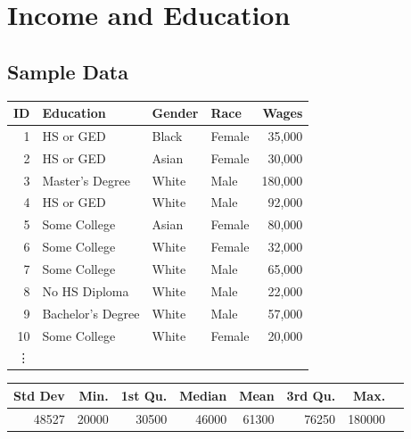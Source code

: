 \documentclass{exam}
\begin{document}

  \section{Income and Education}

  \subsection{Sample Data}

  \begin{table}[H]
    \centering
    \begin{tabular}{rlllr}
      \toprule
        ID & Education         & Gender   & Race   & Wages \\
      \midrule
         1 & HS or GED         & Black & Female & 35,000 \\
         2 & HS or GED         & Asian & Female & 30,000 \\
         3 & Master's Degree   & White & Male   & 180,000 \\
         4 & HS or GED         & White & Male   & 92,000 \\
         5 & Some College      & Asian & Female & 80,000 \\
         6 & Some College      & White & Female & 32,000 \\
         7 & Some College      & White & Male   & 65,000 \\
         8 & No HS Diploma     & White & Male   & 22,000 \\
         9 & Bachelor's Degree & White & Male   & 57,000 \\
        10 & Some College      & White & Female & 20,000 \\
        \vdots \\
      \bottomrule
    \end{tabular}
  \end{table}

  \begin{table}[ht]
    \centering
    \begin{tabular}{rrrrrrrr}
      \toprule
        Std Dev & Min.  & 1st Qu. & Median & Mean  & 3rd Qu. & Max. \\
      \midrule
        48527   & 20000 & 30500   & 46000  & 61300 & 76250   & 180000 \\
      \bottomrule
    \end{tabular}
  \end{table}
\end{document}
